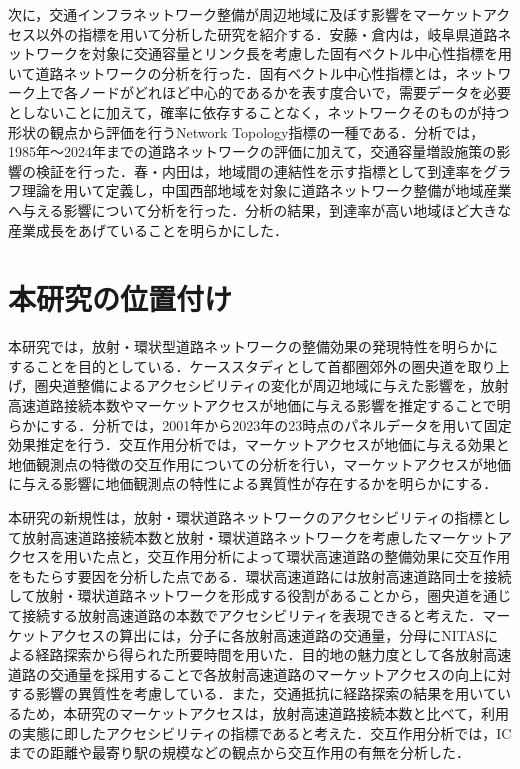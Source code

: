 次に，交通インフラネットワーク整備が周辺地域に及ぼす影響をマーケットアクセス以外の指標を用いて分析した研究を紹介する．安藤・倉内\cite{kurauchi2020}は，岐阜県道路ネットワークを対象に交通容量とリンク長を考慮した固有ベクトル中心性指標を用いて道路ネットワークの分析を行った．固有ベクトル中心性指標とは，ネットワーク上で各ノードがどれほど中心的であるかを表す度合いで，需要データを必要としないことに加えて，確率に依存することなく，ネットワークそのものが持つ形状の観点から評価を行うNetwork Topology指標の一種である．分析では，1985年〜2024年までの道路ネットワークの評価に加えて，交通容量増設施策の影響の検証を行った．春・内田\cite{haru2011}は，地域間の連結性を示す指標として到達率をグラフ理論を用いて定義し，中国西部地域を対象に道路ネットワーク整備が地域産業へ与える影響について分析を行った．分析の結果，到達率が高い地域ほど大きな産業成長をあげていることを明らかにした．

\section{本研究の位置付け}
本研究では，放射・環状型道路ネットワークの整備効果の発現特性を明らかにすることを目的としている．ケーススタディとして首都圏郊外の圏央道を取り上げ，圏央道整備によるアクセシビリティの変化が周辺地域に与えた影響を，放射高速道路接続本数やマーケットアクセスが地価に与える影響を推定することで明らかにする．分析では，2001年から2023年の23時点のパネルデータを用いて固定効果推定を行う．交互作用分析では，マーケットアクセスが地価に与える効果と地価観測点の特徴の交互作用についての分析を行い，マーケットアクセスが地価に与える影響に地価観測点の特性による異質性が存在するかを明らかにする．

本研究の新規性は，放射・環状道路ネットワークのアクセシビリティの指標として放射高速道路接続本数と放射・環状道路ネットワークを考慮したマーケットアクセスを用いた点と，交互作用分析によって環状高速道路の整備効果に交互作用をもたらす要因を分析した点である．環状高速道路には放射高速道路同士を接続して放射・環状道路ネットワークを形成する役割があることから，圏央道を通じて接続する放射高速道路の本数でアクセシビリティを表現できると考えた．マーケットアクセスの算出には，分子に各放射高速道路の交通量，分母にNITASによる経路探索から得られた所要時間を用いた．目的地の魅力度として各放射高速道路の交通量を採用することで各放射高速道路のマーケットアクセスの向上に対する影響の異質性を考慮している．また，交通抵抗に経路探索の結果を用いているため，本研究のマーケットアクセスは，放射高速道路接続本数と比べて，利用の実態に即したアクセシビリティの指標であると考えた．交互作用分析では，ICまでの距離や最寄り駅の規模などの観点から交互作用の有無を分析した．

